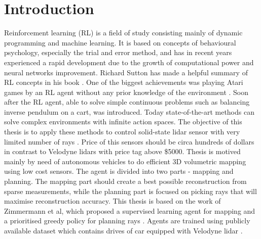 \section{Introduction}

Reinforcement learning (RL) is a field of study consisting mainly of dynamic programming and machine learning. It is based on concepts of behavioural psychology, especially the trial and error method, and has in recent years experienced a rapid development due to the growth of computational power and neural networks improvement. Richard Sutton has made a helpful summary of RL concepts in his book \cite{sutton2012}. One of the biggest achievements was playing Atari games by an RL agent without any prior knowledge of the environment \cite{mnih2015}. Soon after the RL agent, able to solve simple continuous problems such as balancing inverse pendulum on a cart, was introduced. Today state-of-the-art methods can solve complex environments with infinite action spaces. The objective of this thesis is to apply these methods to control solid-state lidar sensor with very limited number of rays \cite{quanergy2016}. Price of this sensors should be circa hundreds of dollars in contrast to Velodyne lidars with price tag above \$5000. Thesis is motived mainly by need of autonomous vehicles to do efficient 3D volumetric mapping using low cost sensors. The agent is divided into two parts - mapping and planning. The mapping part should create a best possible reconstruction from sparse measurements, while the planning part is focused on picking rays that will maximise reconstruction accuracy. This thesis is based on the work of Zimmermann et al, which proposed a supervised learning agent for mapping and a prioritised greedy policy for planning rays \cite{zimmermann2017}. Agents are trained using publicly available dataset which contains drives of car equipped with Velodyne lidar \cite{geiger2013}. 